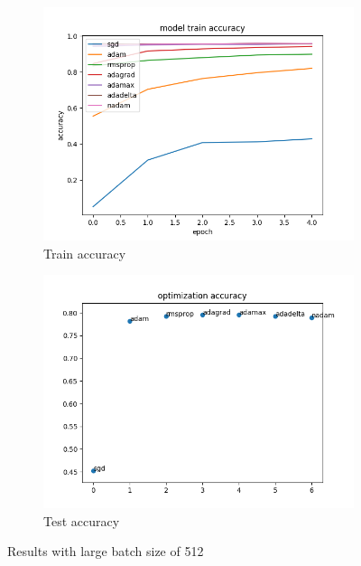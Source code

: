 \documentclass{article}
\begin{document}
\begin{figure}[H]
    \centering
    \begin{subfigure}[b]{0.7\textwidth}
        \includegraphics[width=\textwidth]{largebatchtraing.png}
        \caption{Train accuracy}
        \label{fig:largebathctrain}
    \end{subfigure}
    \begin{subfigure}[b]{0.7\textwidth}
        \includegraphics[width=\textwidth]{largebatchtestacc.png}
        \caption{Test accuracy}
        \label{fig:largetestacc}
    \end{subfigure}
    \caption{Results with large batch size of 512}\label{fig:rlb}
\end{figure}
\end{document}
